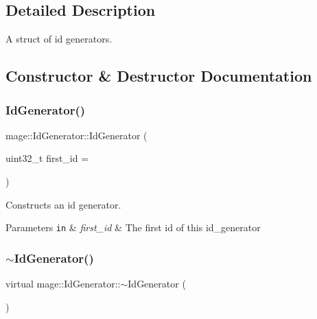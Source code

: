 \subsection{Detailed Description}
A struct of id generators. 

\subsection{Constructor \& Destructor Documentation}
\hypertarget{structmage_1_1_id_generator_aede1dd978436b3e108646896666e177e}{}\label{structmage_1_1_id_generator_aede1dd978436b3e108646896666e177e} 
\subsubsection{\texorpdfstring{Id\+Generator()}{IdGenerator()}\hspace{0.1cm}{\footnotesize\ttfamily [1/2]}}
{\footnotesize\ttfamily mage\+::\+Id\+Generator\+::\+Id\+Generator (\begin{DoxyParamCaption}\item[{uint32\+\_\+t}]{first\+\_\+id = {} }\end{DoxyParamCaption})}

Constructs an id generator.


\begin{DoxyParams}[1]{Parameters}
\mbox{\tt in}  & {\em first\+\_\+id} & The first id of this id\+\_\+generator \\
\hline
\end{DoxyParams}
\hypertarget{structmage_1_1_id_generator_aea2ded07fd7b34ff43150fe6e6f4882a}{}\label{structmage_1_1_id_generator_aea2ded07fd7b34ff43150fe6e6f4882a} 
\subsubsection{\texorpdfstring{$\sim$\+Id\+Generator()}{~IdGenerator()}}
{\footnotesize\ttfamily virtual mage\+::\+Id\+Generator\+::$\sim$\+Id\+Generator (\begin{DoxyParamCaption}{ }\end{DoxyParamCaption})\hspace{0.3cm}{\ttfamily [virtual]}}

